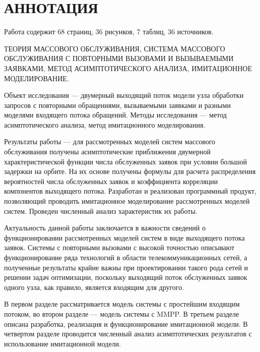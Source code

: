 \section*{\normalsize\centering АННОТАЦИЯ}
Работа содержит 68 страниц, 36 рисунков, 7 таблиц, 36 источников.
 
ТЕОРИЯ МАССОВОГО ОБСЛУЖИВАНИЯ, СИСТЕМА МАССОВОГО ОБСЛУЖИВАНИЯ С ПОВТОРНЫМИ ВЫЗОВАМИ И ВЫЗЫВАЕМЫМИ ЗАЯВКАМИ, МЕТОД АСИМПТОТИЧЕСКОГО АНАЛИЗА, ИМИТАЦИОННОЕ МОДЕЛИРОВАНИЕ.

Объект исследования --- двумерный выходящий поток модели узла обработки запросов с повторными обращениями, вызываемыми заявками и разными моделями входящего потока обращений.
Методы исследования --- метод асимптотического анализа, метод имитационного моделирования. 

Результаты работы --- для рассмотренных моделей систем массового обслуживания получены асимптотические приближения двумерной характеристической функции числа обслуженных заявок при условии большой задержки на орбите. На их основе получены формулы для расчета распределения вероятностей числа обслуженных заявок и коэффициента корреляции компонентов выходящего потока. Разработан и реализован программный продукт, позволяющий проводить имитационное моделирование рассмотренных моделей систем. Проведен численный анализ характеристик их работы.

Актуальность данной работы заключается в важности сведений о функционировании рассмотренных моделей систем в виде выходящего потока заявок. Системы с повторными вызовами с высокой точностью описывают функционирование ряда технологий в области телекоммуникационных сетей, а полученные результаты крайне важны при проектировании такого рода сетей и решении задач оптимизации, поскольку выходящий поток обслуженных заявок одного узла, как правило, является входящим для другого.

В первом разделе рассматривается модель системы с простейшим входящим потоком, во втором разделе --- модель системы с MMPP. В третьем разделе описана разработка, реализация и функционирование имитационной модели. В четвертом разделе проводится численный анализ асимптотических результатов с использование имитационной модели.

\thispagestyle{empty} %
\clearpage